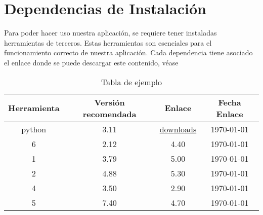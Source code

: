 \chapter{Dependencias de Instalación}
\label{Appendix:Key1}

Para poder hacer uso nuestra aplicación, se requiere tener instaladas herramientas de terceros. Estas herramientas son esenciales para el funcionamiento correcto de nuestra aplicación.
Cada dependencia tiene asociado el enlace donde se puede descargar este contenido, véase


\begin{table}
    \centering
	\begin{tabular}{c|c|c|c}
		\textbf{Herramienta} & \textbf{Versión recomendada} & \textbf{Enlace} & \textbf{Fecha Enlace} \\
		\hline\hline
		python & 3.11 & \href{https://www.python.org/downloads/}{downloads} & \today\\
		6 & 2.12 & 4.40 & \today\\
		1 & 3.79 & 5.00 & \today\\
		2 & 4.88 & 5.30 & \today\\
		4 & 3.50 & 2.90 & \today\\
		5 & 7.40 & 4.70 & \today\\
		\hline
	\end{tabular}
	\caption{Tabla de ejemplo}
	\label{tab:sampleTable}
\end{table}